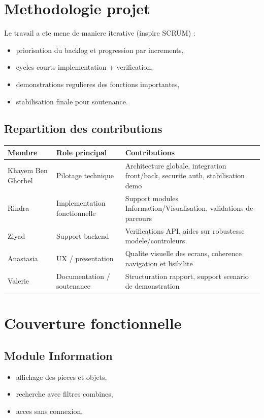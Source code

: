 \documentclass[11pt,a4paper]{article}
\begin{document}
\section{Methodologie projet}

Le travail a ete mene de maniere iterative (inspire SCRUM) :
\begin{itemize}
  \item priorisation du backlog et progression par increments,
  \item cycles courts implementation + verification,
  \item demonstrations regulieres des fonctions importantes,
  \item stabilisation finale pour soutenance.
\end{itemize}

\subsection{Repartition des contributions}

\begin{longtable}{|p{3.2cm}|p{4.2cm}|p{7.2cm}|}
\hline
\textbf{Membre} & \textbf{Role principal} & \textbf{Contributions} \\
\hline
Khayem Ben Ghorbel & Pilotage technique & Architecture globale, integration front/back, securite auth, stabilisation demo \\
\hline
Rindra & Implementation fonctionnelle & Support modules Information/Visualisation, validations de parcours \\
\hline
Ziyad & Support backend & Verifications API, aides sur robustesse modele/controleurs \\
\hline
Anastasia & UX / presentation & Qualite visuelle des ecrans, coherence navigation et lisibilite \\
\hline
Valerie & Documentation / soutenance & Structuration rapport, support scenario de demonstration \\
\hline
\end{longtable}

\section{Couverture fonctionnelle}

\subsection{Module Information}
\begin{itemize}
  \item affichage des pieces et objets,
  \item recherche avec filtres combines,
  \item acces sans connexion.
\end{itemize}
\end{document}
